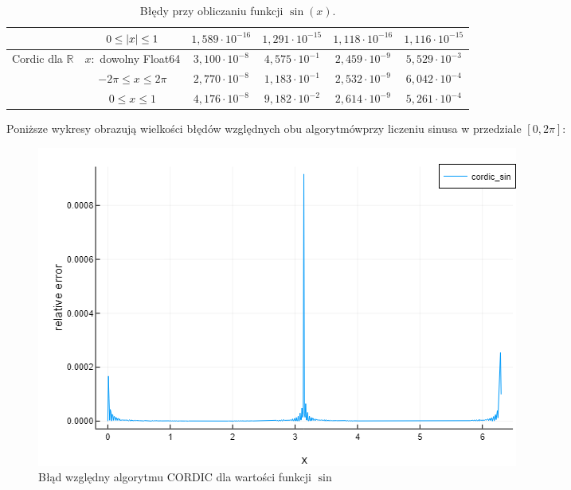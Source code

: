 \documentclass{mwart}
\newcommand{\RR}{\mathbb{R}}
\DeclarePairedDelimiter\abs{\lvert}{\rvert}%
\theoremstyle{remark}
\theoremstyle{definition}
\theoremstyle{definition}
\begin{document}
\begin{table}[H]
{{\begin{tabular}{ |c||c|c|c|c|c| }
          \cline{2-6}
                                                                      & $0 \leq \abs{x} \leq 1$        & $1,589 \cdot 10^{-16}$ & $1,291 \cdot 10^{-15}$ & $1,118 \cdot 10^{-16}$ & $1,116 \cdot 10^{-15}$ \\
          \hline
          \multirow{3}{6em}{Cordic dla $\RR$}                         & $x:$ dowolny Float64           & $3,100 \cdot 10^{-8}$  & $4,575 \cdot 10^{-1}$  & $2,459 \cdot 10^{-9}$  & $5,529 \cdot 10^{-3}$  \\
          \cline{2-6}
                                                                      & $-2\pi \leq x \leq 2\pi$       & $2,770 \cdot 10^{-8}$  & $1,183 \cdot 10^{-1}$  & $2,532 \cdot 10^{-9}$  & $6,042 \cdot 10^{-4}$  \\
          \cline{2-6}
                                                                      & $0 \leq x \leq 1$              & $4,176 \cdot 10^{-8}$  & $9,182 \cdot 10^{-2}$  & $2,614 \cdot 10^{-9}$  & $5,261 \cdot 10^{-4}$  \\
          \hline
        \end{tabular}
      }}
  \caption{Błędy przy obliczaniu funkcji $\sin(x)$.}
  \label{tab:2}
\end{table}
\clearpage

Poniższe wykresy obrazują wielkości błędów względnych obu algorytmów\newline przy liczeniu sinusa w przedziale $[0, 2\pi]$:
\begin{figure}[H]
\centering
    \includegraphics[scale = 0.6]{cordic error.png}
    \caption{Błąd względny algorytmu CORDIC dla wartości funkcji $\sin$}
    \label{rys:1}
\end{figure}
\end{document}
